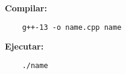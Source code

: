 
\textbf{Compilar: }
\begin{verbatim}
	g++-13 -o name.cpp name 
\end{verbatim}	

\vspace*{1cm}

\textbf{Ejecutar:}
\begin{verbatim}
	./name 
\end{verbatim}